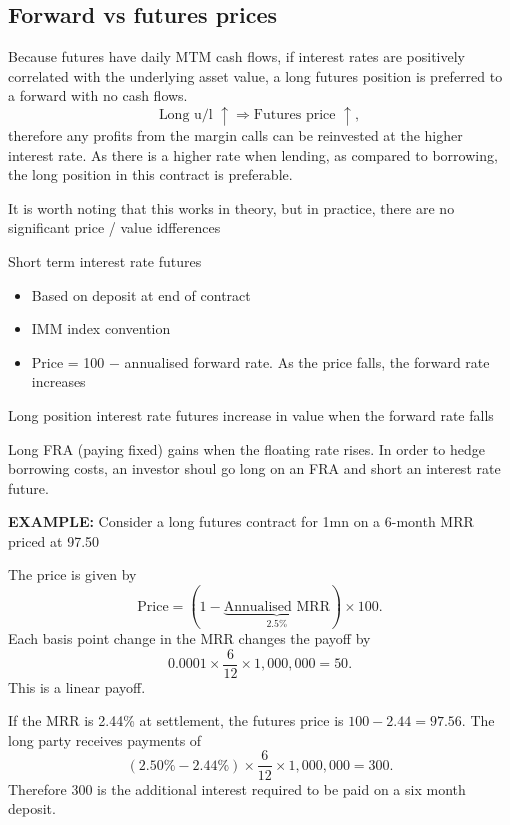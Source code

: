 \documentclass[../notes_compiled.tex]{subfiles}
\begin{document}
\subsection{Forward vs futures prices}
\begin{itemize}
\item Because futures have daily MTM cash flows, if interest rates are positively correlated with the underlying asset value, a long futures position is preferred to a forward with no cash flows.
\begin{equation*}
\text{Long u/l }\uparrow \Rightarrow \text{Futures price } \uparrow, 
\end{equation*}
therefore any profits from the margin calls can be reinvested at the higher interest rate. As there is a higher rate when lending, as compared to borrowing, the long position in this contract is preferable. 
\item It is worth noting that this works in theory, but in practice, there are no significant price / value idfferences
\item[]
\item Short term interest rate futures
\begin{itemize}
\item Based on deposit at end of contract
\item IMM index convention
\item Price = 100 $-$ annualised forward rate. As the price falls, the forward rate increases
\end{itemize}
\item Long position interest rate futures increase in value when the forward rate falls
\item Long FRA (paying fixed) gains when the floating rate rises. In order to hedge borrowing costs, an investor shoul go long on an FRA and short an interest rate future.
{\color{RedViolet}
\item[] \textbf{EXAMPLE:} Consider a long futures contract for 1mn on a 6-month MRR priced at 97.50
}
{\color{RoyalBlue}
\item[] The price is given by
\begin{equation*}
\text{Price} = (1 - \underbrace{\text{Annualised MRR}}_{2.5\%}) \times 100.
\end{equation*}
Each basis point change in the MRR changes the payoff by
\begin{equation*}
0.0001 \times \frac{6}{12} \times 1,000,000 = 50.
\end{equation*}
This is a linear payoff.
\item[] If the MRR is 2.44\% at settlement, the futures price is $100-2.44=97.56$. The long party receives payments of \begin{equation*}
(2.50\% - 2.44\%) \times \frac{6}{12} \times 1,000,000 = 300.
\end{equation*}
Therefore 300 is the additional interest required to be paid on a six month deposit.

}
\end{itemize}
\end{document}
